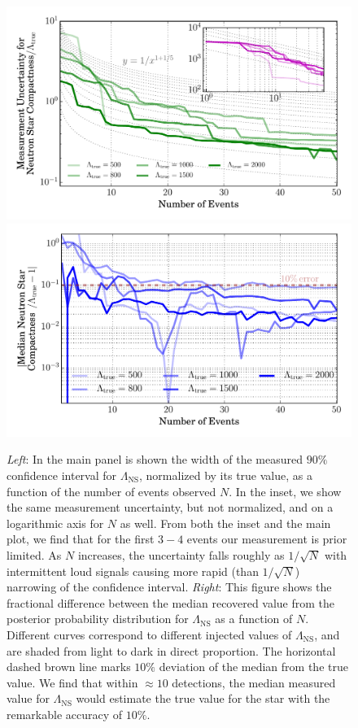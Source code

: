 \documentclass[aps,prd,amsmath,floats,floatfix, twocolumn,
superscriptaddress,nofootinbib,showpacs]{revtex4-1}
\newcommand{\lambdans}{\Lambda_\mathrm{NS}}
\begin{document}
%
% 
%
% 
\begin{figure}
\centering    
\includegraphics[width=1.\columnwidth]{plots/LambdaCIWidths_vs_N.pdf}
\includegraphics[width=1.\columnwidth]{plots/RelErrorLambdaMedian_vs_N.pdf}
\caption{{\it Left}: In the main panel is shown the width of the measured $90\%$ 
confidence interval for $\lambdans$, normalized by its true value,
 as a function of the number of events observed $N$. In the inset, we
 show the same measurement uncertainty, but not normalized, and on a 
 logarithmic axis for $N$ as well.
% 
 From both the inset and the main plot, we find that for the first $3-4$ events
 our measurement is prior limited. As $N$ increases, the uncertainty falls 
 roughly as $1/\sqrt{N}$ with intermittent loud signals causing more rapid 
 (than $1/\sqrt{N}$) narrowing of the confidence interval.
%  
 {\it Right}: This figure shows the fractional difference between the median
 recovered value from the posterior probability distribution for $\lambdans$
 as a function of $N$. Different curves correspond to different injected values
 of $\lambdans$, and are shaded from light to dark in direct proportion. 
 The horizontal dashed brown line marks $10\%$ deviation of the median from the 
 true value.
%  
We find that within $\approx 10$ detections, the median measured value for
$\lambdans$ would estimate the true value for the star with the remarkable 
accuracy of $10\%$.
}
\label{fig:TT_LambdaError_vs_N_L500_2000_CI90_0}
\end{figure}
\end{document}

